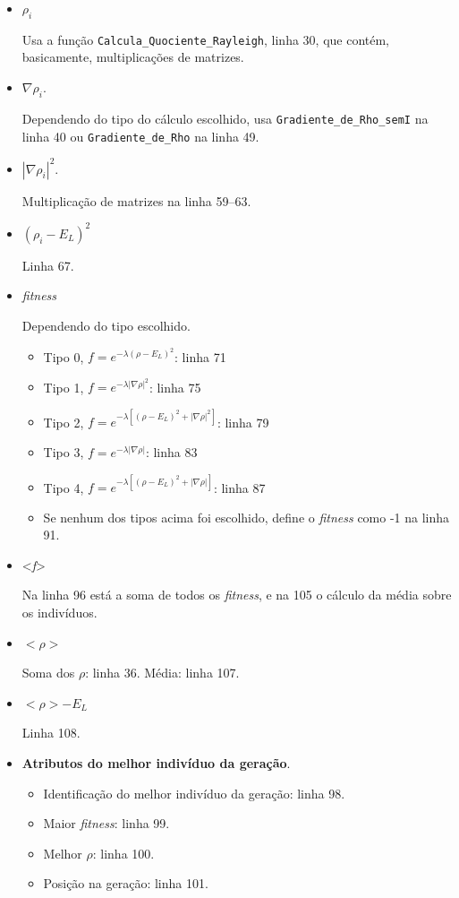 	\begin{itemize}
	
		\item $\rho_i$
		
		Usa a função \texttt{Calcula\_Quociente\_Rayleigh}, linha 30, que contém, basicamente, multiplicações de matrizes.
		
		\item $\nabla \rho_i$.
		
		Dependendo do tipo do cálculo escolhido, usa \texttt{Gradiente\_de\_Rho\_semI} na linha 40 ou \texttt{Gradiente\_de\_Rho} na linha 49.
		
		\item $|\nabla \rho_i|^2$.
		
		Multiplicação de matrizes na linha 59--63.
		
		\item $(\rho_i - E_L)^2$
		
		Linha 67.
		
		\item \emph{fitness}
		
		Dependendo do tipo escolhido.
		
		\begin{itemize}
			\item Tipo 0, $f = e^{-\lambda(\rho - E_L)^2}$: linha 71
			\item Tipo 1, $f = e^{-\lambda |\nabla \rho|^2}$: linha 75
			\item Tipo 2, $f = e^{-\lambda [(\rho - E_L)^2 + |\nabla \rho|^2]}$: linha 79
			\item Tipo 3, $f = e^{-\lambda |\nabla \rho|}$: linha 83
			\item Tipo 4, $f = e^{-\lambda [(\rho - E_L)^2 + |\nabla \rho|]}$: linha 87
			\item Se nenhum dos tipos acima foi escolhido, define o \emph{fitness} como -1 na linha 91.
		\end{itemize}
		
		\item <\emph{f}>
		
		Na linha 96 está a soma de todos os \emph{fitness}, e na 105 o cálculo da média sobre os indivíduos.
		
		\item $<\rho>$
		
			Soma dos $\rho$: linha 36. Média: linha 107.
			
		\item \textbf{$<\rho> - E_L$}
			
			Linha 108.
			
		\item \textbf{Atributos do melhor indivíduo da geração}.
		
		\begin{itemize}
			\item Identificação do melhor indivíduo da geração: linha 98.
			\item Maior \emph{fitness}: linha 99.
			\item Melhor $\rho$: linha 100.
			\item Posição na geração: linha 101.
		\end{itemize}
		
	\end{itemize}

